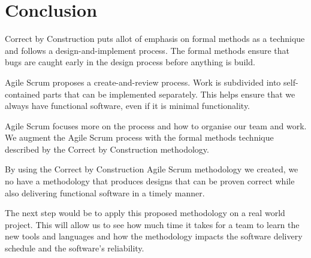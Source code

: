 
\chapter{Conclusion} %

\label{Chapter_Conclusion} %

Correct by Construction puts allot of emphasis on formal methods as a technique
and follows a design-and-implement process. The formal methods ensure that bugs 
are caught early in the design process before anything is build. 

Agile Scrum proposes a create-and-review process. Work is subdivided into 
self-contained parts that can be implemented separately. This helps ensure that
we always have functional software, even if it is minimal functionality.

Agile Scrum focuses more on the process and how to organise our team and work.
We augment the Agile Scrum process with the formal methods technique described 
by the Correct by Construction methodology.

By using the Correct by Construction Agile Scrum methodology we created, we no 
have a methodology that produces designs that can be proven correct while also 
delivering functional software in a timely manner.

The next step would be to apply this proposed methodology on a real world project.
This will allow us to see how much time it takes for a team to learn the new tools 
and languages and how the methodology impacts the software delivery schedule 
and the software's reliability.

